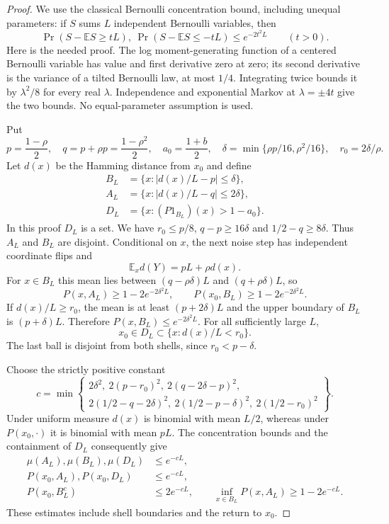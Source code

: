 \documentclass[11pt]{article}
\newcommand{\E}{\mathbb E}
\begin{document}
\begin{proof}
We use the classical Bernoulli concentration bound, including unequal
parameters: if $S$ sums $L$ independent Bernoulli variables, then
\[
 \Pr(S-\E S\geq tL),\ \Pr(S-\E S\leq-tL)
       \leq e^{-2t^2L}\qquad(t>0).
\]
Here is the needed proof. The log moment-generating function of a
centered Bernoulli variable has value and first derivative zero at zero;
its second derivative is the variance of a tilted Bernoulli law, at most
$1/4$. Integrating twice bounds it by $\lambda^2/8$ for every real
$\lambda$. Independence and exponential Markov at $\lambda=\pm4t$
give the two bounds. No equal-parameter assumption is used.

Put
\[
 p=\frac{1-\rho}{2},\quad q=p+\rho p=\frac{1-\rho^2}{2},\quad
 a_0=\frac{1+b}{2},\quad
 \delta=\min\{\rho p/16,\rho^2/16\},\quad r_0=2\delta/\rho.
\]
Let $d(x)$ be the Hamming distance from $x_0$ and define
\begin{align*}
 B_L&=\{x:|d(x)/L-p|\leq\delta\},\\
 A_L&=\{x:|d(x)/L-q|\leq2\delta\},\\
 D_L&=\{x:(P1_{B_L})(x)>1-a_0\}.
\end{align*}
In this proof $D_L$ is a set. We have $r_0\leq p/8$,
$q-p\geq16\delta$ and $1/2-q\geq8\delta$. Thus $A_L$ and $B_L$
are disjoint. Conditional on $x$, the next noise step has independent
coordinate flips and
\[
 \E_x d(Y)=pL+\rho d(x).
\]
For $x\in B_L$ this mean lies between $(q-\rho\delta)L$ and
$(q+\rho\delta)L$, so
\[
 P(x,A_L)\geq1-2e^{-2\delta^2L},\qquad
 P(x_0,B_L)\geq1-2e^{-2\delta^2L}.
\]
If $d(x)/L\geq r_0$, the mean is at least $(p+2\delta)L$ and the
upper boundary of $B_L$ is $(p+\delta)L$. Therefore
$P(x,B_L)\leq e^{-2\delta^2L}$. For all sufficiently large $L$,
\[
 x_0\in D_L\subset\{x:d(x)/L<r_0\}.
\]
The last ball is disjoint from both shells, since $r_0<p-\delta$.

Choose the strictly positive constant
\[
 c=\min\left\{
 \begin{gathered}
 2\delta^2,\ 2(p-r_0)^2,\ 2(q-2\delta-p)^2,\\
 2(1/2-q-2\delta)^2,\ 2(1/2-p-\delta)^2,\ 2(1/2-r_0)^2
 \end{gathered}\right\}.
\]
Under uniform measure $d(x)$ is binomial with mean $L/2$, whereas
under $P(x_0,\cdot)$ it is binomial with mean $pL$. The concentration
bounds and the containment of $D_L$ consequently give
\begin{align}
 \mu(A_L),\mu(B_L),\mu(D_L)&\leq e^{-cL},\nonumber\\
 P(x_0,A_L),P(x_0,D_L)&\leq e^{-cL},\nonumber\\
 P(x_0,B_L^c)&\leq2e^{-cL},\qquad
 \inf_{x\in B_L}P(x,A_L)\geq1-2e^{-cL}.
 \label{denominatorshellbounds}
\end{align}
These estimates include shell boundaries and the return to $x_0$.


\end{proof}
\end{document}
